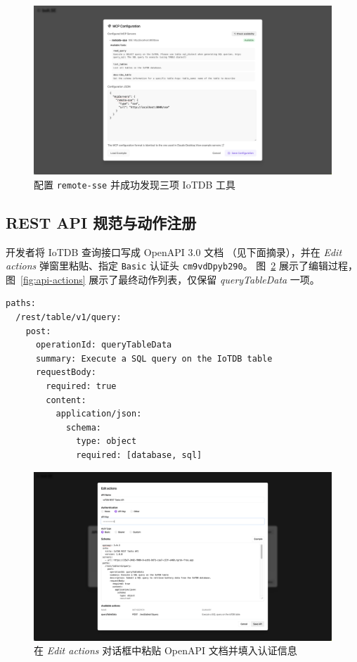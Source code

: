 \begin{figure}[htbp]
  \centering
  \includegraphics[width=.7\textwidth]{figures/screenshots/iotdb-demo/mcp-config.png}
  \caption{配置 \texttt{remote-sse} 并成功发现三项 IoTDB 工具}
  \label{fig:mcp-config}
\end{figure}

\subsection{REST API 规范与动作注册}

开发者将 IoTDB 查询接口写成 OpenAPI 3.0 文档
（见下面摘录），并在
\textit{Edit actions} 弹窗里粘贴、指定 \texttt{Basic}
认证头 \verb|cm9vdDpyb290|。  
图~\ref{fig:openapi-editor} 展示了编辑过程，图~\ref{fig:api-actions}
展示了最终动作列表，仅保留 \textit{queryTableData} 一项。

\begin{verbatim}
paths:
  /rest/table/v1/query:
    post:
      operationId: queryTableData
      summary: Execute a SQL query on the IoTDB table
      requestBody:
        required: true
        content:
          application/json:
            schema:
              type: object
              required: [database, sql]
\end{verbatim}

\begin{figure}[htbp]
  \centering
  \includegraphics[width=.7\textwidth]{figures/screenshots/iotdb-demo/openapi-editor.png}
  \caption{在 \textit{Edit actions} 对话框中粘贴 OpenAPI 文档并填入认证信息}
  \label{fig:openapi-editor}
\end{figure}

